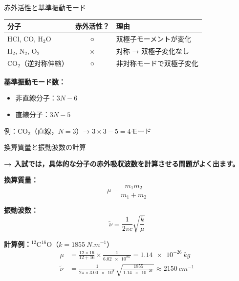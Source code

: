 \documentclass[aspectratio=169, 11pt]{beamer}
\newcommand{\teacher}[1]{{\color{darkblue}\textbf{→ #1}}}
\begin{document}
\begin{frame}{赤外活性と基準振動モード}

\begin{tabular}{lcl}
  \toprule
  分子 & 赤外活性？ & 理由 \\
  \midrule
  HCl, CO, H$_2$O & ○ & 双極子モーメントが変化 \\
  H$_2$, N$_2$, O$_2$ & × & 対称 → 双極子変化なし \\
  CO$_2$（逆対称伸縮） & ○ & 非対称モードで双極子変化 \\
  \bottomrule
\end{tabular}

\vspace{0.6em}
\textbf{基準振動モード数：}
\begin{itemize}
  \item 非直線分子：$3N - 6$
  \item 直線分子：$3N - 5$
\end{itemize}

{\small 例：CO$_2$（直線，$N=3$）→ $3\times3 - 5 = 4$モード}
\end{frame}

\begin{frame}{換算質量と振動波数の計算}

\teacher{入試では，具体的な分子の赤外吸収波数を計算させる問題がよく出ます。}

\vspace{0.3em}
\textbf{換算質量：}
\[
  \mu = \frac{m_1 m_2}{m_1 + m_2}
\]

\textbf{振動波数：}
\[
  \tilde{\nu} = \frac{1}{2\pi c}\sqrt{\frac{k}{\mu}}
\]

\vspace{0.3em}
\textbf{計算例：}$^{12}$C$^{16}$O（$k = \SI{1855}{N.m^{-1}}$）
\begin{align}
  \mu &= \frac{12 \times 16}{12 + 16} \times \frac{1}{\SI{6.02e23}{}} = \SI{1.14e-26}{kg} \\[4pt]
  \tilde{\nu} &= \frac{1}{2\pi \times \SI{3.00e8}{}}\sqrt{\frac{1855}{\SI{1.14e-26}{}}}
  \approx \SI{2150}{cm^{-1}}
\end{align}
\end{frame}
\end{document}
